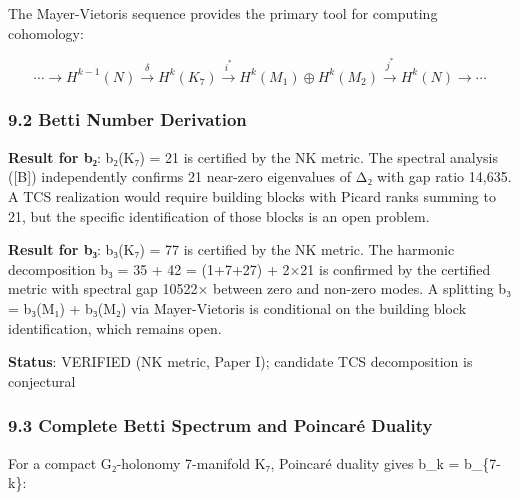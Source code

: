 \documentclass[11pt,a4paper]{article}
\begin{document}
{{{{{{{{{{{{{{{{The Mayer-Vietoris sequence provides the primary tool for computing cohomology:

\[\cdots \to H^{k-1}(N) \xrightarrow{\delta} H^k(K_7) \xrightarrow{i^*} H^k(M_1) \oplus H^k(M_2) \xrightarrow{j^*} H^k(N) \to \cdots\]

\subsubsection{9.2 Betti Number Derivation}\label{betti-number-derivation}

\textbf{Result for b₂}: b₂(K₇) = 21 is certified by the NK metric. The spectral analysis ([B]) independently confirms 21 near-zero eigenvalues of Δ₂ with gap ratio 14,635. A TCS realization would require building blocks with Picard ranks summing to 21, but the specific identification of those blocks is an open problem.

\textbf{Result for b₃}: b₃(K₇) = 77 is certified by the NK metric. The harmonic decomposition b₃ = 35 + 42 = (1+7+27) + 2×21 is confirmed by the certified metric with spectral gap 10522× between zero and non-zero modes. A splitting b₃ = b₃(M₁) + b₃(M₂) via Mayer-Vietoris is conditional on the building block identification, which remains open.

\textbf{Status}: VERIFIED (NK metric, Paper I); candidate TCS decomposition is conjectural

\subsubsection{9.3 Complete Betti Spectrum and Poincaré Duality}\label{complete-betti-spectrum-and-poincaruxe9-duality}

For a compact G₂-holonomy 7-manifold K₇, Poincaré duality gives b\_k = b\_\{7-k\}:

}}}}}}}}}}}}}}}}
\end{document}
